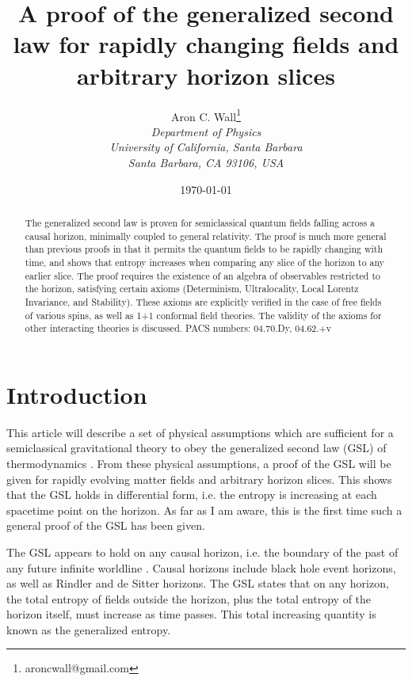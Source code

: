\documentclass{article}
\author{Aron C. Wall\footnote{aroncwall@gmail.com}
\\ \textit{Department of Physics} \\ \textit{University of California, Santa Barbara}
\\ \textit{Santa Barbara, CA 93106, USA} }
\title{A proof of the generalized second law for rapidly changing fields and arbitrary horizon slices}
\date{\today}
\begin{document}
\maketitle

\begin{abstract}
The generalized second law is proven for semiclassical quantum fields falling across a causal horizon, minimally coupled to general relativity.  The proof is much more general than previous proofs in that it permits the quantum fields to be rapidly changing with time, and shows that entropy increases when comparing any slice of the horizon to any earlier slice.  The proof requires the existence of an algebra of observables restricted to the horizon, satisfying certain axioms (Determinism, Ultralocality, Local Lorentz Invariance, and Stability).  These axioms are explicitly verified in the case of free fields of various spins, as well as 1+1 conformal field theories.  The validity of the axioms for other interacting theories is discussed.
\newline\newline
PACS numbers: 04.70.Dy, 04.62.+v
\end{abstract}

\newpage
\tableofcontents
\newpage

\section{Introduction}

This article will describe a set of physical assumptions which are sufficient for a semiclassical gravitational theory to obey the generalized second law (GSL) of thermodynamics \cite{hawking75}.  From these physical assumptions, a proof of the GSL will be given for rapidly evolving matter fields and arbitrary horizon slices.  This shows that the GSL holds in differential form, i.e. the entropy is increasing at each spacetime point on the horizon.  As far as I am aware, this is the first time such a general proof of the GSL has been given.

The GSL appears to hold on any causal horizon, i.e. the boundary of the past of any future infinite worldline \cite{JP03}.  Causal horizons include black hole event horizons, as well as Rindler and de Sitter horizons.  The GSL states that on any horizon, the total entropy of fields outside the horizon, plus the total entropy of the horizon itself, must increase as time passes.  This total increasing quantity is known as the generalized entropy.
\end{document}
